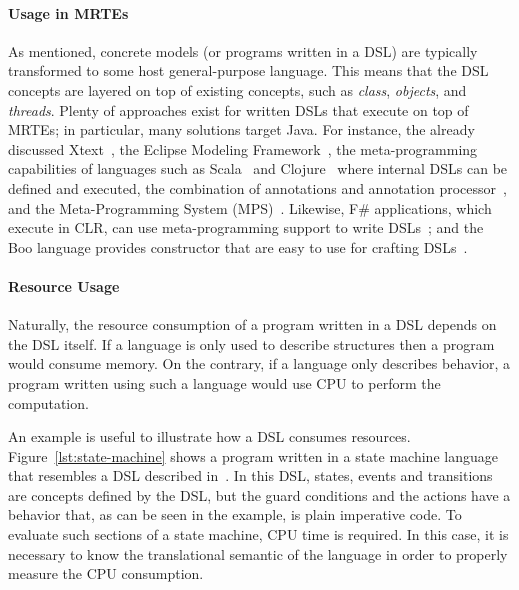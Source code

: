\paragraph{Usage in MRTEs} As mentioned, concrete models (or programs written in a DSL) are typically transformed to some host general-purpose language. This means that the DSL concepts are layered on top of existing concepts, such as \textit{class}, \textit{objects}, and \textit{threads}.
Plenty of approaches exist for written DSLs that execute on top of MRTEs; in particular, many solutions target Java.
For instance, the already discussed Xtext~\cite{Eysholdt:2010:XIY:1869542.1869625}, the Eclipse Modeling Framework~\cite{EMFModeling}, the meta-programming capabilities of languages such as Scala~\cite{Hofer:2010:MDL:1868294.1868307} and Clojure~\cite{Kelker2013} where internal DSLs can be defined and executed, the combination of annotations and annotation processor~\cite{Huang2008}, and  the Meta-Programming System (MPS)~\cite{JetBrainsMetaProgrammingSystem(MPS),Voelter2014}.
Likewise, F\# applications, which execute in CLR, can use meta-programming support to write DSLs~\cite{Cheney:2013:PTL:2500365.2500586}; and the Boo language provides constructor that are easy to use for crafting DSLs~\cite{Rahien2010}. 

\paragraph{Resource Usage}
Naturally, the resource consumption of a program written in a DSL depends on the DSL itself.
If a language is only used to describe structures then a program would consume memory.
On the contrary, if a language only describes behavior, a program written using such a language would use CPU to perform the computation.

An example is useful to illustrate how a DSL consumes resources.
Figure~\ref{lst:state-machine} shows a program written in a state machine language that resembles a DSL described in~\cite{Voelter2010}.
In this DSL, states, events and transitions are concepts defined by the DSL, but the guard conditions and the actions have a behavior that, as can be seen in the example, is plain imperative code.
To evaluate such sections of a state machine, CPU time is required.
In this case, it is necessary to know the translational semantic of the language in order to properly measure the CPU consumption.


